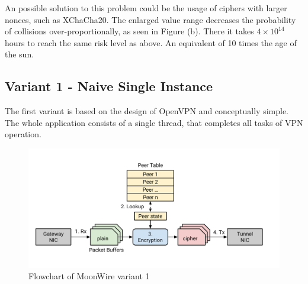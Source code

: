 An possible solution to this problem could be the usage of ciphers with larger nonces, such as XChaCha20. The enlarged value range decreases the probability of collisions over-proportionally, as seen in Figure (b). There it takes $4\times 10^{14}$ hours to reach the same risk level as above. An equivalent of 10 times the age of the sun.




%


\subsection{Variant 1 - Naive Single Instance}
The first variant is based on the design of OpenVPN and conceptually simple. The whole application consists of a single thread, that completes all tasks of VPN operation.

\begin{figure}[h]
	\centering
	\includegraphics[width=0.9\linewidth]{figures/moonwire-variant-1}
	\caption{Flowchart of MoonWire variant 1}
	\label{fig:moonwire-variant-1}
\end{figure}

